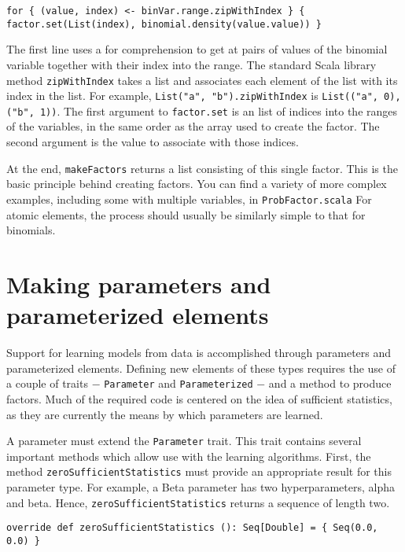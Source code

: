 \begin{flushleft}
\texttt{for \{ (value, index) <- binVar.range.zipWithIndex \} \{
\newline \tab factor.set(List(index), binomial.density(value.value))
\newline \}
}
\end{flushleft}

The first line uses a for comprehension to get at pairs of values of the binomial variable together with their index into the range. The standard Scala library method \texttt{zipWithIndex} takes a list and associates each element of the list with its index in the list. For example, \texttt{List("a", "b").zipWithIndex} is \texttt{List(("a", 0), ("b", 1))}. The first argument to \texttt{factor.set} is an list of indices into the ranges of the variables, in the same order as the array used to create the factor. The second argument is the value to associate with those indices.

At the end, \texttt{makeFactors} returns a list consisting of this single factor. This is the basic principle behind creating factors. You can find a variety of more complex examples, including some with multiple variables, in  \texttt{ProbFactor.scala} For atomic elements, the process should usually be similarly simple to that for binomials.

\section{Making parameters and parameterized elements}

Support for learning models from data is accomplished through parameters and parameterized elements. Defining new elements of these types requires the use of a couple of traits $-$ \texttt{Parameter} and \texttt{Parameter\-ized} $-$ and a method to produce factors. Much of the required code is centered on the idea of sufficient statistics, as they are currently the means by which parameters are learned. 

A parameter must extend the \texttt{Parameter} trait. This trait contains several important methods which allow use with the learning algorithms. First, the method \texttt{zeroSufficientStatistics} must provide an appropriate result for this parameter type. For example, a Beta parameter has two hyperparameters, alpha and beta. Hence, \texttt{zeroSuffic\-ientStatistics} returns a sequence of length two.

\begin{flushleft}
\texttt{override def zeroSufficientStatistics (): Seq[Double] = \{ 
\newline \tab Seq(0.0, 0.0)
\newline \}
}
\end{flushleft}

